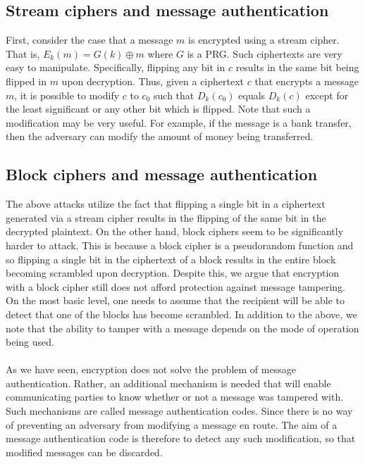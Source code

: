 \documentclass{article}
\begin{document}
\subsection{Stream ciphers and message authentication} First, consider the case that a message $m$ is encrypted using a stream cipher. That is, $E_k(m) = G(k) \oplus m$ where $G$ is a PRG. Such ciphertexts are very easy to manipulate. Specifically, flipping any bit in $c$ results in the same bit being flipped in $m$ upon decryption. Thus, given a ciphertext $c$ that encrypts a message $m$, it is possible to modify $c$ to $c_0$ such that $D_k(c_0)$ equals $D_k(c)$ except for the least significant or any other bit which is flipped. Note that such a modification may be very useful. For example, if the message is a bank transfer, then the adversary can modify the amount of money being transferred.
\subsection{Block ciphers and message authentication} The above attacks utilize the fact that flipping a single bit in a ciphertext generated via a stream cipher results in the flipping of the same bit in the decrypted plaintext. On the other hand, block ciphers seem to be significantly harder to attack. This is because a block cipher is a pseudorandom function and so flipping a single bit in the ciphertext of a block results in the entire block becoming scrambled upon decryption. Despite this, we argue that encryption with a block cipher still does not afford protection against message tampering. On the most basic level, one needs to assume that the recipient will be able to detect that one of the blocks has become scrambled. In addition to the above, we note that the ability to tamper with a message depends on the mode of operation being used. \\ \\
As we have seen, encryption does not solve the problem of message authentication. Rather, an additional mechanism is needed that will enable communicating parties to know whether or not a message was tampered with. Such mechanisms are called message authentication codes. Since there is no way of preventing an adversary from modifying a message en route. The aim of a message authentication code is therefore to detect any such modification, so that modified messages can be discarded.
\end{document}
